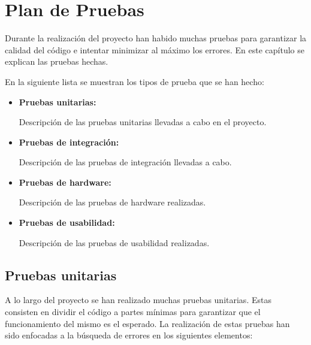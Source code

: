 \chapter{Plan de Pruebas}

	Durante la realización del proyecto han habido muchas pruebas para garantizar la calidad del código e intentar minimizar al máximo los errores. En este capítulo se explican las pruebas hechas.

	En la siguiente lista se muestran los tipos de prueba que se han hecho:

	\begin{itemize}
		\item \textbf{Pruebas unitarias:}
			
		Descripción de las pruebas unitarias llevadas a cabo en el proyecto.

		\item \textbf{Pruebas de integración:}
			
		Descripción de las pruebas de integración llevadas a cabo.

		\item \textbf{Pruebas de hardware:}
			
		Descripción de las pruebas de hardware realizadas.

		\item \textbf{Pruebas de usabilidad:}
			
		Descripción de las pruebas de usabilidad realizadas.
	\end{itemize}

\section{Pruebas unitarias}

	A lo largo del proyecto se han realizado muchas pruebas unitarias. Estas consisten en dividir el código a partes mínimas para garantizar que el funcionamiento del mismo es el esperado. La realización de estas pruebas han sido enfocadas a la búsqueda de errores en los siguientes elementos:


